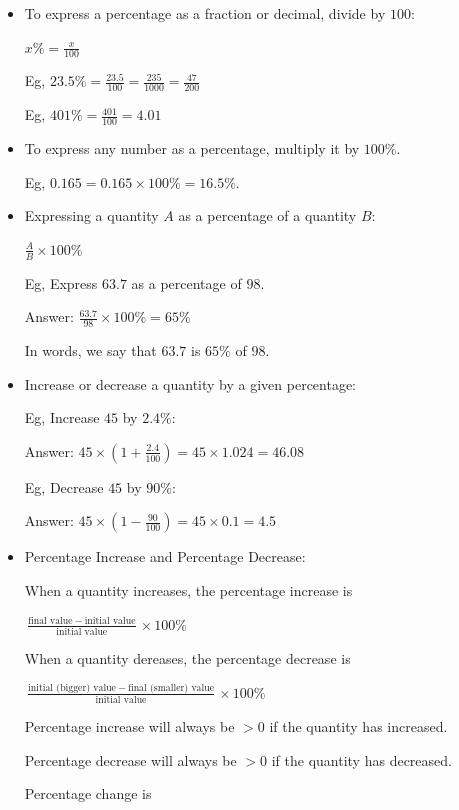 \documentclass[twocolumn]{article}
\begin{document}
\begin{itemize}  

\item To express a percentage as a fraction or decimal, divide by $100$:

$
x \%=\frac{x}{100}
$

Eg, $23.5 \% = \frac{23.5}{100} = \frac{235}{1000} = \frac{47}{200}$

Eg, $401 \% = \frac{401}{100} = 4.01$

\item To express any number as a percentage, multiply it by $100 \%$.

Eg, $0.165 = 0.165 \times 100 \% = 16.5 \%$.

\item Expressing a quantity $A$ as a percentage of a quantity $B$:

$
\frac{A}{B} \times 100 \%
$

Eg, Express $63.7$ as a percentage of $98$. 

Answer: $\frac{63.7}{98} \times 100\% = 65 \%$

In words, we say that $63.7$ is $65 \%$ of $98$. 

\item Increase or decrease a quantity by a given percentage:

Eg, Increase $45$ by $2.4 \%$:

Answer: $45 \times \left(1+\frac{2.4}{100}\right) = 45 \times 1.024 = 46.08$  

Eg, Decrease $45$ by $90 \%$:

Answer: $45 \times \left(1-\frac{90}{100}\right) = 45 \times 0.1 = 4.5$

\item Percentage Increase and Percentage Decrease:

When a quantity increases, the percentage increase is

$\frac{\text{final value} \ - \ \text{initial value}}{\text{initial value}} \times 100\%$

When a quantity dereases, the percentage decrease is

$\frac{\text{initial (bigger) value} \ - \ \text{final (smaller) value}}{\text{initial value}} \times 100\%$

Percentage increase will always be $> 0$ if the quantity has increased.

Percentage decrease will always be $> 0$ if the quantity has decreased.

Percentage change is


\end{itemize}
\end{document}
